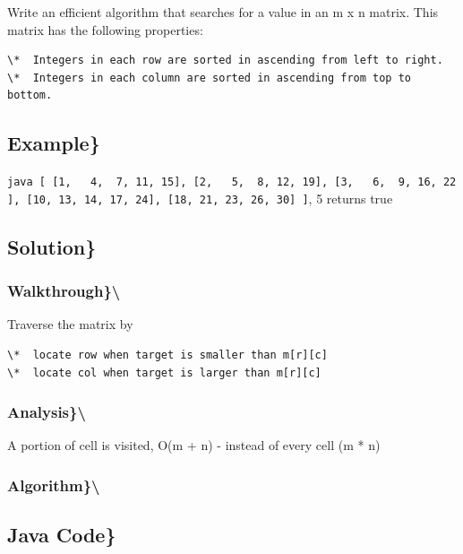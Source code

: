 \documentclass[]{book}
\begin{document}
Write an efficient algorithm that searches for a value in an m x n matrix. This matrix has the following properties:

\begin{verbatim}
\*  Integers in each row are sorted in ascending from left to right.
\*  Integers in each column are sorted in ascending from top to bottom.
\end{verbatim}

\hypertarget{example-43}{%
\subsection{Example\}}\label{example-43}}

\texttt{java\ {[}\ {[}1,\ \ \ 4,\ \ 7,\ 11,\ 15{]},\ {[}2,\ \ \ 5,\ \ 8,\ 12,\ 19{]},\ {[}3,\ \ \ 6,\ \ 9,\ 16,\ 22{]},\ {[}10,\ 13,\ 14,\ 17,\ 24{]},\ {[}18,\ 21,\ 23,\ 26,\ 30{]}\ {]}}, 5 returns true

\hypertarget{solution-34}{%
\subsection{Solution\}}\label{solution-34}}

\hypertarget{walkthrough-43}{%
\subsubsection{Walkthrough\}\textbackslash{}}\label{walkthrough-43}}

Traverse the matrix by

\begin{verbatim}
\*  locate row when target is smaller than m[r][c]
\*  locate col when target is larger than m[r][c]
\end{verbatim}

\hypertarget{analysis-48}{%
\subsubsection{Analysis\}\textbackslash{}}\label{analysis-48}}

A portion of cell is visited, O(m + n) - instead of every cell (m * n)

\hypertarget{algorithm-48}{%
\subsubsection{Algorithm\}\textbackslash{}}\label{algorithm-48}}

\hypertarget{java-code-39}{%
\subsection{Java Code\}}\label{java-code-39}}
\end{document}

